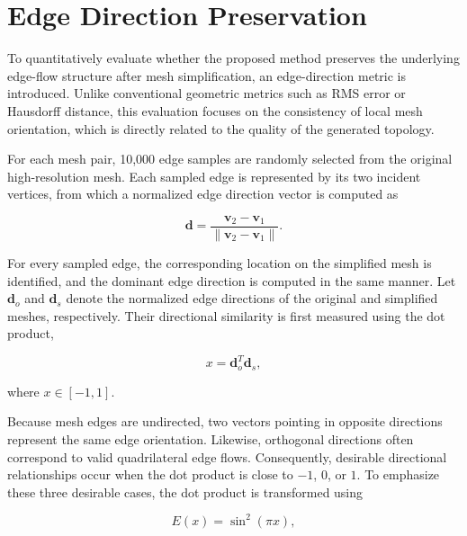 \documentclass[../main.tex]{subfiles}
\begin{document}


\section{Edge Direction Preservation}
\label{sec:edge_direction_eval}

To quantitatively evaluate whether the proposed method preserves the underlying edge-flow structure after mesh simplification, an edge-direction metric is introduced. Unlike conventional geometric metrics such as RMS error or Hausdorff distance, this evaluation focuses on the consistency of local mesh orientation, which is directly related to the quality of the generated topology.

For each mesh pair, 10,000 edge samples are randomly selected from the original high-resolution mesh. Each sampled edge is represented by its two incident vertices, from which a normalized edge direction vector is computed as

\begin{equation}
	\mathbf{d}
	=
	\frac{\mathbf{v}_2-\mathbf{v}_1}
	{\|\mathbf{v}_2-\mathbf{v}_1\|}.
\end{equation}

For every sampled edge, the corresponding location on the simplified mesh is identified, and the dominant edge direction is computed in the same manner. Let $\mathbf{d}_o$ and $\mathbf{d}_s$ denote the normalized edge directions of the original and simplified meshes, respectively. Their directional similarity is first measured using the dot product,

\begin{equation}
	x=\mathbf{d}_o^{T}\mathbf{d}_s,
\end{equation}

where $x\in[-1,1]$.

Because mesh edges are undirected, two vectors pointing in opposite directions represent the same edge orientation. Likewise, orthogonal directions often correspond to valid quadrilateral edge flows. Consequently, desirable directional relationships occur when the dot product is close to $-1$, $0$, or $1$. To emphasize these three desirable cases, the dot product is transformed using

\begin{equation}
	E(x)=\sin^{2}(\pi x),
\end{equation}
\end{document}
